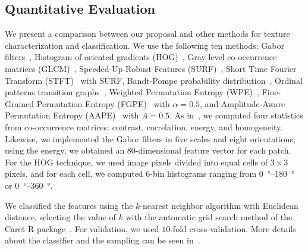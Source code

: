 \documentclass[journal]{IEEEtran}
\begin{document}
\subsection{Quantitative Evaluation}

We present a comparison between our proposal and other methods for texture characterization and classification.
We use the following ten methods: 
Gabor filters~\cite{weldon1996efficient},  
Histogram of oriented gradients (HOG)~\cite{dalal2005histograms},
Gray-level co-occurrence matrices (GLCM)~\cite{kourgli2012texture}, 
Speeded-Up Robust Features (SURF)~\cite{bay2006surf},
Short Time Fourier Transform (STFT)~\cite{portnoff1980time} with SURF,
Bandt-Pompe probability distribution~\cite{Bandt2002Permutation}, 
Ordinal patterns transition graphs~\cite{Borges2019Transition},
Weighted Permutation Entropy (WPE)~\cite{Fadlallah2013Weightedpermutation},
Fine-Grained Permutation Entropy (FGPE)~\cite{xiao2009fine} with $\alpha = 0.5$, and
Amplitude-Aware Permutation Entropy (AAPE)~\cite{azami2016amplitude} with $A = 0.5$.
As in~\cite{guan2019covariance}, 
we computed four statistics from co-occurrence matrices: contrast, correlation, energy, and homogeneity.
Likewise, we implemented the Gabor filters in five scales and eight orientations; using the energy, we obtained an $80$-dimensional feature vector for each patch.
For the HOG technique, we used image pixels divided into equal cells of $3 \times 3$ pixels, and for each cell, we computed 6-bin histograms ranging from \SIrange{0}{180}{\degree} or \SIrange{0}{360}{\degree}.

We classified the features using the $k$-nearest neighbor algorithm with Euclidean distance, selecting the value of $k$ with the automatic grid search method of the Caret R package~\cite{kuhn2008building}.
For validation, we used $10$-fold cross-validation.
More details about the classifier and the sampling can be seen in~\cite{mitchell1997machine}.
\end{document}
